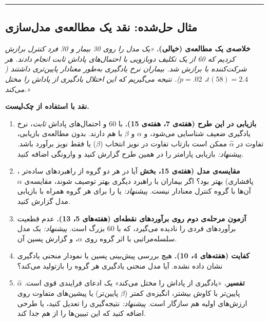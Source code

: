 \begin{center}\rule{0.5\linewidth}{0.5pt}\end{center}

\subsection{مثال حل‌شده: نقد یک مطالعه‌ی مدل‌سازی}

\textbf{خلاصه‌ی یک مطالعه‌ی (خیالی).} \emph{«یک مدل  را روی
30 بیمار و 30 فرد کنترل برازش کردیم که 60  از یک تکلیف
 دوبازویی با احتمال‌های پاداش ثابت انجام دادند. هر شرکت‌کننده
با  برازش شد. بیماران نرخ یادگیری به‌طور معنادار پایین‌تری داشتند
(\(t(58) = 2.4\)، \(p = .02\)). نتیجه می‌گیریم که این اختلال یادگیری از
پاداش را مختل می‌کند.»}

\textbf{نقد با استفاده از چک‌لیست.}

\begin{enumerate}
\def\labelenumi{\arabic{enumi}.}
\tightlist
\item
  \textbf{بازیابی در این طرح (هفته‌ی 7،  هفته‌ی 15).} با 60
   و احتمال‌های پاداش \emph{ثابت}، نرخ یادگیری ضعیف شناسایی
  می‌شود، و \(\alpha\) و \(\beta\) با هم  دارند. بدون
  مطالعه‌ی بازیابی، تفاوت در \(\hat\alpha\) ممکن است بازتاب تفاوت در نویز
  انتخاب (\(\beta\)) یا فقط نویز برآورد باشد. \emph{پیشنهاد:} بازیابی
  پارامتر را در همین طرح گزارش کنید و وارونگی اضافه کنید.
\item
  \textbf{مقایسه‌ی مدل (هفته‌ی 15، بخش } آیا  در هر
  دو گروه از راهبردهای ساده‌تر ، پافشاری) بهتر بود؟ اگر بیماران
  با راهبرد دیگری بهتر توصیف شوند، مقایسه‌ی \(\alpha\) آن‌ها با گروه کنترل
  معنادار نیست. \emph{پیشنهاد:}  یا  را برای هر گروه
  همراه با بازیابی مدل گزارش کنید.
\item
  \textbf{آزمون  مرحله‌ی دوم روی برآوردهای نقطه‌ای (هفته‌های 5، 13).}
  عدم قطعیت برآوردهای فردی را نادیده می‌گیرد، که با 60  بزرگ
  است. \emph{پیشنهاد:} یک مدل سلسله‌مراتبی با اثر گروه روی \(\alpha\)، و
  گزارش پسین آن.
\item
  \textbf{کفایت (هفته‌های 4، 10).} هیچ بررسی پیش‌بینی پسین یا نمودار منحنی
  یادگیری نشان داده نشده. آیا مدل منحنی یادگیری هر گروه را بازتولید
  می‌کند؟
\item
  \textbf{تفسیر.} «یادگیری از پاداش را مختل می‌کند» یک ادعای فرایندی قوی
  است. \(\hat\alpha\) پایین‌تر با کاوش بیشتر، انگیزه‌ی کمتر (\(\beta\)
  پایین‌تر) یا پیشین‌های متفاوت روی ارزش‌های اولیه هم سازگار است.
  \emph{پیشنهاد:} نتیجه‌گیری را تعدیل کنید، یا طرحی اضافه کنید که این
  تبیین‌ها را از هم جدا کند.
\end{enumerate}


